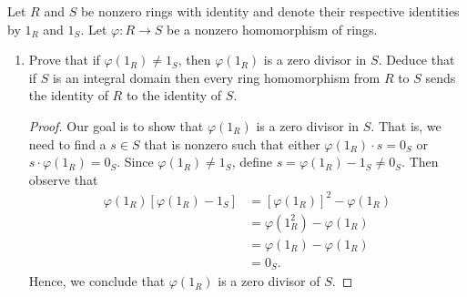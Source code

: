 \documentclass[a4paper]{article}
\begin{document}
\begin{problem}
   Let \( R  \) and \( S  \) be nonzero rings with identity and denote their respective identities by \( {1}_{R} \) and \( {1}_{S} \). Let \( \varphi : R \to S  \) be a nonzero homomorphism of rings.
   \begin{enumerate}
       \item[(a)] Prove that if \( \varphi({1}_{R}) \neq {1}_{S} \), then \( \varphi({1}_{R}) \) is a zero divisor in \( S  \). Deduce that if \( S  \) is an integral domain then every ring homomorphism from \( R  \) to \( S  \) sends the identity of \( R  \) to the identity of \( S  \). 
           \begin{proof}
           Our goal is to show that \( \varphi({1}_{R}) \) is a zero divisor in \( S  \). That is, we need to find a \( s \in S  \) that is nonzero such that either \( \varphi({1}_{R})\cdot s = {0}_{S} \) or \( s \cdot \varphi({1}_{R}) = {0}_{S} \). Since \( \varphi({1}_{R}) \neq {1}_{S} \), define \( s = \varphi({1}_{R}) - {1}_{S} \neq {0}_{S} \). Then observe that 
           \begin{align*}
               \varphi({1}_{R}) [\varphi({1}_{R}) - {1}_{S}] &= [\varphi({1}_{R})]^{2} - \varphi({1}_{R}) \\
                                                             &= \varphi({1}_{R}^{2}) - \varphi({1}_{R}) \\
                                                             &= \varphi({1}_{R}) - \varphi({1}_{R}) \\
                                                             &= {0}_{S}.
           \end{align*}
           Hence, we conclude that \( \varphi({1}_{R}) \) is a zero divisor of \( S  \).


\end{proof}
\end{enumerate}
\end{problem}
\end{document}
